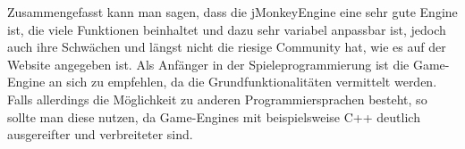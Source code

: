 Zusammengefasst kann man sagen, dass die jMonkeyEngine eine sehr gute Engine ist, die viele Funktionen beinhaltet und dazu sehr variabel anpassbar ist, jedoch auch ihre Schwächen und längst nicht die riesige Community hat, wie es auf der Website angegeben ist. Als Anfänger in der Spieleprogrammierung ist die Game-Engine an sich zu empfehlen, da die Grundfunktionalitäten vermittelt werden. Falls allerdings die Möglichkeit zu anderen Programmiersprachen besteht, so sollte man diese nutzen, da Game-Engines mit beispielsweise C++ deutlich ausgereifter und verbreiteter sind.

